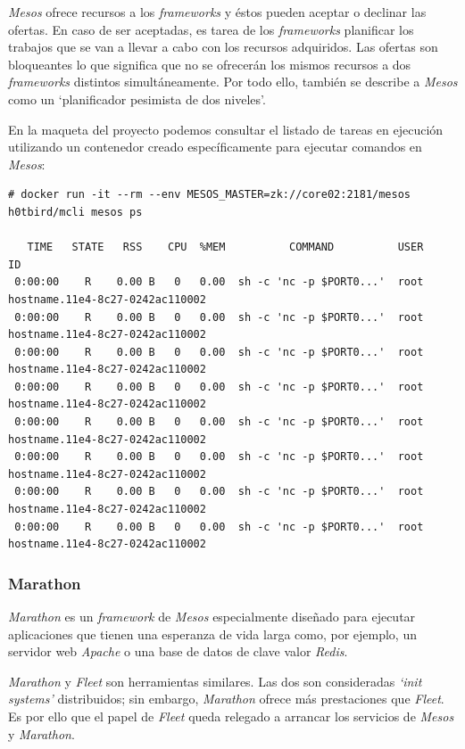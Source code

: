 \documentclass[a4paper,12pt,spanish,final]{epsc_tfc_pfc}
\begin{document}
\emph{Mesos} ofrece recursos a los \emph{frameworks} y éstos pueden aceptar o declinar las ofertas. En caso de ser aceptadas, es tarea de los \emph{frameworks} planificar los trabajos que se van a llevar a cabo con los recursos adquiridos. Las ofertas son bloqueantes lo que significa que no se ofrecerán los mismos recursos a dos \emph{frameworks} distintos simultáneamente. Por todo ello, también se describe a \emph{Mesos} como un `planificador pesimista de dos niveles'.

En la maqueta del proyecto podemos consultar el listado de tareas en ejecución utilizando un contenedor creado específicamente para ejecutar comandos en \emph{Mesos}:\\

\begin{lstlisting}[style=dnsmasq]
# docker run -it --rm --env MESOS_MASTER=zk://core02:2181/mesos h0tbird/mcli mesos ps

   TIME   STATE   RSS    CPU  %MEM          COMMAND          USER                        ID
 0:00:00    R    0.00 B   0   0.00  sh -c 'nc -p $PORT0...'  root  hostname.11e4-8c27-0242ac110002
 0:00:00    R    0.00 B   0   0.00  sh -c 'nc -p $PORT0...'  root  hostname.11e4-8c27-0242ac110002
 0:00:00    R    0.00 B   0   0.00  sh -c 'nc -p $PORT0...'  root  hostname.11e4-8c27-0242ac110002
 0:00:00    R    0.00 B   0   0.00  sh -c 'nc -p $PORT0...'  root  hostname.11e4-8c27-0242ac110002
 0:00:00    R    0.00 B   0   0.00  sh -c 'nc -p $PORT0...'  root  hostname.11e4-8c27-0242ac110002
 0:00:00    R    0.00 B   0   0.00  sh -c 'nc -p $PORT0...'  root  hostname.11e4-8c27-0242ac110002
 0:00:00    R    0.00 B   0   0.00  sh -c 'nc -p $PORT0...'  root  hostname.11e4-8c27-0242ac110002
 0:00:00    R    0.00 B   0   0.00  sh -c 'nc -p $PORT0...'  root  hostname.11e4-8c27-0242ac110002
\end{lstlisting}

\subsubsection{Marathon}

\emph{Marathon} es un \emph{framework} de \emph{Mesos} especialmente diseñado para ejecutar aplicaciones que tienen una esperanza de vida larga como, por ejemplo, un servidor web \emph{Apache} o una base de datos de clave valor \emph{Redis}.

\emph{Marathon} y \emph{Fleet} son herramientas similares. Las dos son consideradas \emph{`init systems'} distribuidos; sin embargo, \emph{Marathon} ofrece más prestaciones que \emph{Fleet}. Es por ello que el papel de \emph{Fleet} queda relegado a arrancar los servicios de \emph{Mesos} y \emph{Marathon}.
\end{document}
